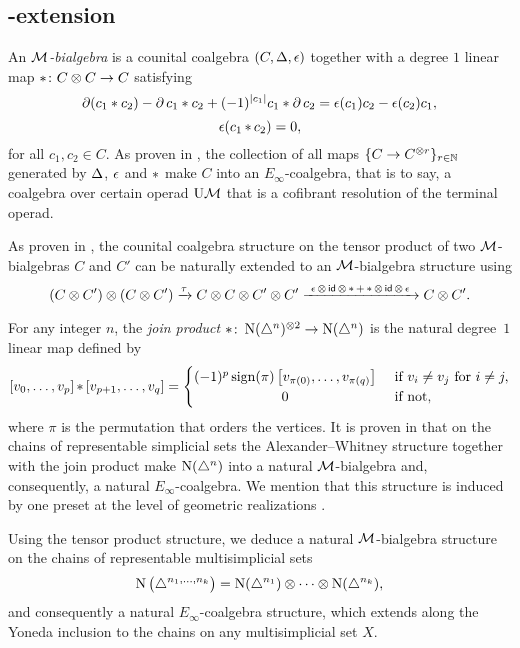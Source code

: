 \subsection{\pdfEinfty-extension}\label{ss:e-infty extension}

An \textit{$\mathcal{M}$-bialgebra} is a counital coalgebra $(C, \operatorname{\Delta}, \operatorname{\epsilon})$ together with a degree $1$ linear map $\operatorname{\ast} \colon C \otimes C \to C$ satisfying
\[
\operatorname{\partial} (c_1 \ast c_2) - \operatorname{\partial} c_1 \ast c_2 + (-1)^{\lvert c_1\rvert} c_1 \ast \operatorname{\partial} c_2 =
\operatorname{\epsilon}(c_1) c_2 - \operatorname{\epsilon}(c_2) c_1,
\]
\[
\operatorname{\epsilon} (c_1 \operatorname{\ast} c_2) = 0,
\]
for all $c_1, c_2 \in C$.
As proven in \cite{medina2020prop1}, the collection of all maps $\{C \to C^{\otimes r}\}_{r \in \mathbb{N}}$ generated by $\operatorname{\Delta}$, $\operatorname{\epsilon}$ and $\operatorname{\ast}$ make $C$ into an $E_\infty$-coalgebra, that is to say, a coalgebra over certain operad $\mathrm{U}\mathcal{M}$ that is a cofibrant resolution of the terminal operad.

As proven in \cite{medina2021cobar}, the counital coalgebra structure on the tensor product of two $\mathcal{M}$-bialgebras $C$ and $C'$ can be naturally extended to an $\mathcal{M}$-bialgebra structure using
\[
(C \otimes C^\prime) \otimes (C \otimes C^\prime) \xrightarrow{\tau}
C \otimes C \otimes C^\prime \otimes C^\prime
\xrightarrow{\ \operatorname{\epsilon} \otimes \, \mathsf{id} \, \otimes \, \operatorname{\ast} + \operatorname{\ast} \otimes \, \mathsf{id} \, \otimes \,\operatorname{\epsilon}\ }
C \otimes C^\prime.
\]

For any integer $n$, the \textit{join product} $\ast \colon \operatorname{N}(\triangle^n)^{\otimes 2} \to \operatorname{N}(\triangle^n)$ is the natural degree~$1$ linear map defined by
\begin{equation*}
	\left[v_0, \dots, v_p \right] \pr \left[v_{p+1}, \dots, v_q\right] =
	\begin{cases} (-1)^{p} \sign(\pi) \left[v_{\pi(0)}, \dots, v_{\pi(q)}\right] & \text{ if } v_i \neq v_j \text{ for } i \neq j, \\
		\hfil 0 & \text{ if not}, \end{cases}
\end{equation*}
where $\pi$ is the permutation that orders the vertices.
It is proven in \cite{medina2020prop1} that on the chains of representable simplicial sets the Alexander--Whitney structure together with the join product make $\operatorname{N}(\triangle^n)$ into a natural $\mathcal{M}$-bialgebra and, consequently, a natural $E_\infty$-coalgebra.
We mention that this structure is induced by one preset at the level of geometric realizations \cite{medina2021prop2}.

Using the tensor product structure, we deduce a natural $\mathcal{M}$-bialgebra structure on the chains of representable multisimplicial sets
\[
\operatorname{N}\big(\triangle^{n_1,\dots,n_k}\big) =
\operatorname{N}(\triangle^{n_1}) \otimes\dotsb\otimes \operatorname{N}(\triangle^{n_k}),
\]
and consequently a natural $E_\infty$-coalgebra structure, which extends along the Yoneda inclusion to the chains on any multisimplicial set $X$.


